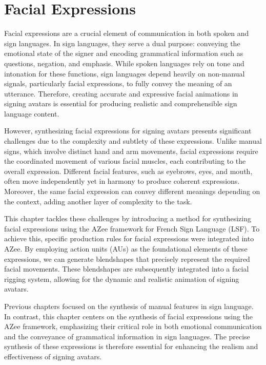 \documentclass[../../main.tex]{subfiles}
\begin{document}
\chapter{Facial Expressions}
\label{ch:facial_expressions}

Facial expressions are a crucial element of communication in both spoken and sign languages. In sign languages, they serve a dual purpose: conveying the emotional state of the signer and encoding grammatical information such as questions, negation, and emphasis. While spoken languages rely on tone and intonation for these functions, sign languages depend heavily on non-manual signals, particularly facial expressions, to fully convey the meaning of an utterance. Therefore, creating accurate and expressive facial animations in signing avatars is essential for producing realistic and comprehensible sign language content.

However, synthesizing facial expressions for signing avatars presents significant challenges due to the complexity and subtlety of these expressions. Unlike manual signs, which involve distinct hand and arm movements, facial expressions require the coordinated movement of various facial muscles, each contributing to the overall expression. Different facial features, such as eyebrows, eyes, and mouth, often move independently yet in harmony to produce coherent expressions. Moreover, the same facial expression can convey different meanings depending on the context, adding another layer of complexity to the task.

This chapter tackles these challenges by introducing a method for synthesizing facial expressions using the AZee framework for French Sign Language (LSF). To achieve this, specific production rules for facial expressions were integrated into AZee. By employing action units (AUs) as the foundational elements of these expressions, we can generate blendshapes that precisely represent the required facial movements. These blendshapes are subsequently integrated into a facial rigging system, allowing for the dynamic and realistic animation of signing avatars.

Previous chapters focused on the synthesis of manual features in sign language. In contrast, this chapter centers on the synthesis of facial expressions using the AZee framework, emphasizing their critical role in both emotional communication and the conveyance of grammatical information in sign languages. The precise synthesis of these expressions is therefore essential for enhancing the realism and effectiveness of signing avatars.
\end{document}
